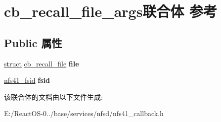 \hypertarget{unioncb__recall__file__args}{}\section{cb\+\_\+recall\+\_\+file\+\_\+args联合体 参考}
\label{unioncb__recall__file__args}
\subsection*{Public 属性}
\begin{DoxyCompactItemize}
\item 
\mbox{\label{unioncb__recall__file__args_a091d616925ea10f682a04efa088a6959}} 
\hyperlink{interfacestruct}{struct} \hyperlink{structcb__recall__file}{cb\+\_\+recall\+\_\+file} {\bfseries file}
\item 
\mbox{\label{unioncb__recall__file__args_a66d6d2a0693bff0638c63d1896189395}} 
\hyperlink{struct____nfs41__fsid}{nfs41\+\_\+fsid} {\bfseries fsid}
\end{DoxyCompactItemize}


该联合体的文档由以下文件生成\+:\begin{DoxyCompactItemize}
\item 
E\+:/\+React\+O\+S-\/0../base/services/nfsd/nfs41\+\_\+callback.\+h\end{DoxyCompactItemize}
